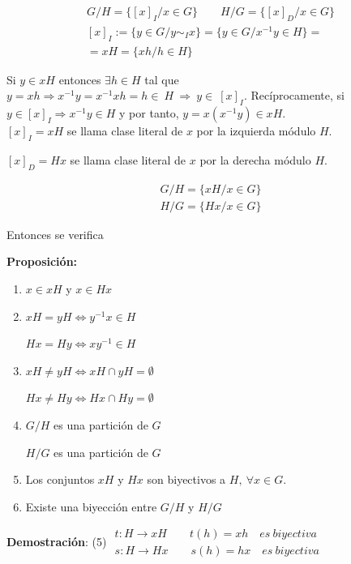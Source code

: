 \documentclass{article}
\begin{document}
\begin{gather*}
G/H=\{[x]_I/x\in G\} \qquad H/G=\{[x]_D/x\in G\} \\
[x]_I:=\{y\in G/y\sim_I x\}=\{y\in G/x^{-1}y\in H\}= \\
=xH=\{xh / h \in H\}
\end{gather*}

Si $y\in xH$ entonces $\exists h \in H$ tal que $y=xh \Rightarrow x^{-1}y=x^{-1}xh=h\in~H~ \Rightarrow~y\in~[x]_I$. Recíprocamente, si $y \in [x]_I \Rightarrow x^{-1}y\in H$ y por tanto, $y=x(x^{-1}y)\in xH$. \\

$[x]_I=xH$ se llama clase literal de $x$ por la izquierda módulo $H$.

$[x]_D=Hx$ se llama clase literal de $x$ por la derecha módulo $H$.

\begin{gather*}
G/H=\{xH/x\in G\} \\
H/G=\{Hx/x\in G\}
\end{gather*}

Entonces se verifica

\textbf{Proposición:} 
\begin{enumerate}[1)]
\item $x\in xH$ y $x\in Hx$

\item $xH=yH\Leftrightarrow y^{-1}x\in H$ 

$Hx=Hy \Leftrightarrow xy^{-1} \in H$

\item $xH\neq yH \Leftrightarrow xH \cap yH=\emptyset$

$Hx\neq Hy \Leftrightarrow Hx\cap Hy=\emptyset $

\item $G/H$ es una partición de $G$

$H/G$ es una partición de $G$

\item Los conjuntos $xH$ y $Hx$ son biyectivos a $H,\: \forall x \in G$.

\item Existe una biyección entre $G/H$ y $H/G$
\end{enumerate}

\textbf{Demostración}: (5) $\left. \begin{array}{c}
t:H\rightarrow xH \qquad t(h)=xh \quad es \: biyectiva \\
s:H\rightarrow Hx \qquad s(h)=hx \quad es \: biyectiva
\end{array} \right. $ \\
\end{document}
